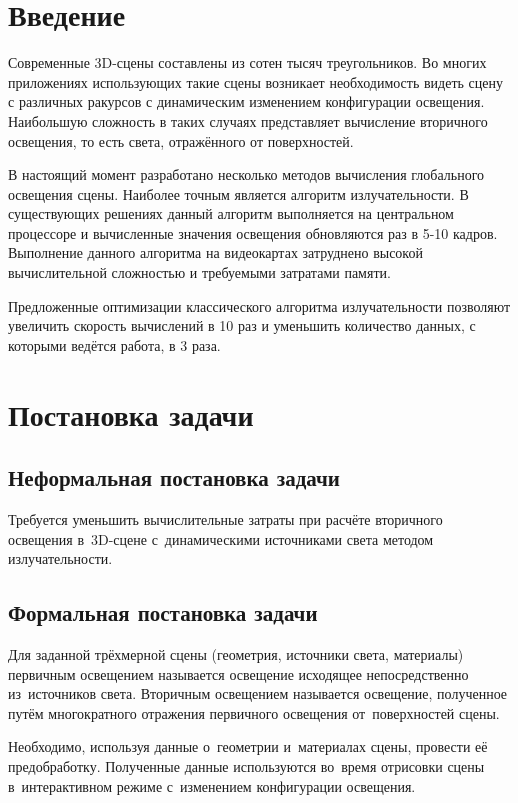 \documentclass[12pt,fleqn]{article}
\begin{document}
\newpage
\section{Введение}

Современные 3D-сцены составлены из сотен тысяч треугольников. Во многих приложениях использующих такие сцены возникает необходимость видеть сцену с различных ракурсов с динамическим изменением конфигурации освещения. Наибольшую сложность в таких случаях представляет вычисление вторичного освещения, то есть света, отражённого от поверхностей.

В настоящий момент разработано несколько методов вычисления глобального освещения сцены. Наиболее точным является алгоритм излучательности. В существующих решениях данный алгоритм выполняется на центральном процессоре и вычисленные значения освещения обновляются раз в 5-10 кадров. Выполнение данного алгоритма на видеокартах затруднено высокой вычислительной сложностью и требуемыми затратами памяти.

Предложенные оптимизации классического алгоритма излучательности позволяют увеличить скорость вычислений в 10 раз и уменьшить количество данных, с которыми ведётся работа, в 3 раза.

\pagebreak

\section{Постановка задачи}

\subsection{Неформальная постановка задачи}

Требуется уменьшить вычислительные затраты при расчёте вторичного освещения в~3D-сцене с~динамическими источниками света методом излучательности.

\subsection{Формальная постановка задачи}

Для заданной трёхмерной сцены (геометрия, источники света, материалы) первичным освещением называется освещение исходящее непосредственно из~источников света. Вторичным освещением называется освещение, полученное путём многократного отражения первичного освещения от~поверхностей сцены.

Необходимо, используя данные о~геометрии и~материалах сцены, провести её предобработку. Полученные данные используются во~время отрисовки сцены в~интерактивном режиме с~изменением конфигурации освещения.
\end{document}
